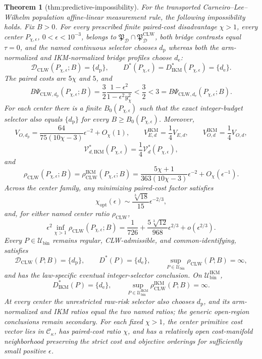 \documentclass{article}
\newtheorem{theorem}{Theorem}
\begin{document}
\begin{theorem}[thm:predictive-impossibility]\label{thm:predictive-impossibility}
For the transported Carneiro--Lee--Wilhelm population affine-linear measurement rule, the following impossibility holds. Fix \(B>0\). For every prescribed finite paired-cost disadvantage \(\chi>1\), every center \(P_{\chi,\epsilon}\), \(0<\epsilon<10^{-3}\), belongs to \(\mathfrak P_{\mathcal D}\cap\mathfrak P_{\mathcal D}^{\mathrm{CLW}}\), both bridge contrasts equal \(\tau=0\), and the named continuous selector chooses \(d_{\mathrm p}\) whereas both the arm-normalized and IKM-normalized bridge profiles choose \(d_{\mathrm e}\):
\[
 \mathcal D_{\mathrm{CLW}}(P_{\chi,\epsilon};B)=\{d_{\mathrm p}\},
 \qquad
 D^*(P_{\chi,\epsilon})=D_{\mathrm{IKM}}^*(P_{\chi,\epsilon})
 =\{d_{\mathrm e}\}.                                      \tag{1}
\]
The paired costs are \(5\chi\) and \(5\), and
\[
 B\Psi_{\mathrm{CLW},d_{\mathrm p}}(P_{\chi,\epsilon};B)
 =\frac32\frac{1-\epsilon^2}{1-\epsilon^2y_\chi^2}
 <\frac32<3
 =B\Psi_{\mathrm{CLW},d_{\mathrm e}}(P_{\chi,\epsilon};B). \tag{2}
\]
For each center there is a finite \(B_0(P_{\chi,\epsilon})\) such that the exact integer-budget selector also equals \(\{d_{\mathrm p}\}\) for every \(B\ge B_0(P_{\chi,\epsilon})\). Moreover,
\[
 V_{O,d_{\mathrm p}}
 =\frac{64}{75(10\chi-3)}\epsilon^{-2}+O_\chi(1),
 \qquad
 V_{E,d}^{\mathrm{IKM}}=\frac14V_{E,d},
 \qquad
 V_{O,d}^{\mathrm{IKM}}=\frac14V_{O,d},                    \tag{3}
\]
\[
 \mathcal V_{d,\mathrm{IKM}}^*(P_{\chi,\epsilon})
 =\frac14\mathcal V_d^*(P_{\chi,\epsilon}),               \tag{4}
\]
and
\[
 \rho_{\mathrm{CLW}}(P_{\chi,\epsilon};B)
 =\rho_{\mathrm{CLW}}^{\mathrm{IKM}}(P_{\chi,\epsilon};B)
 =\frac{5\chi+1}{363(10\chi-3)}\epsilon^{-2}
 +O_\chi(\epsilon^{-1}).                                  \tag{5}
\]
Across the center family, any minimizing paired-cost factor satisfies
\[
 \chi_{\mathrm{opt}}(\epsilon)
 \sim \frac{\sqrt[3]{18}}{15}\epsilon^{-2/3},             \tag{6}
\]
and, for either named center ratio \(\rho_{\mathrm{CLW}}\),
\[
 \epsilon^2\inf_{\chi>1}\rho_{\mathrm{CLW}}(P_{\chi,\epsilon};B)
 =\frac1{726}+\frac{5\sqrt[3]{12}}{968}\epsilon^{2/3}
 +o(\epsilon^{2/3}).                                       \tag{7}
\]
Every \(P\in\mathcal U_{\mathrm{bin}}\) remains regular, CLW-admissible, and common-identifying, satisfies
\[
 \mathcal D_{\mathrm{CLW}}(P;B)=\{d_{\mathrm p}\},
 \qquad D^*(P)=\{d_{\mathrm e}\},
 \qquad
 \sup_{P\in\mathcal U_{\mathrm{bin}}}\rho_{\mathrm{CLW}}(P;B)=\infty, \tag{8}
\]
and has the law-specific eventual integer-selector conclusion. On \(\mathcal U_{\mathrm{bin}}^{\mathrm{IKM}}\),
\[
 D_{\mathrm{IKM}}^*(P)=\{d_{\mathrm e}\},
 \qquad
 \sup_{P\in\mathcal U_{\mathrm{bin}}^{\mathrm{IKM}}}
 \rho_{\mathrm{CLW}}^{\mathrm{IKM}}(P;B)=\infty.          \tag{9}
\]
At every center the unrestricted raw-risk selector also chooses \(d_{\mathrm p}\), and its arm-normalized and IKM ratios equal the two named ratios; the generic open-region conclusions remain secondary. For each fixed \(\chi>1\), the center primitive cost vector lies in \(\mathcal C_\kappa\), has paired-cost ratio \(\chi\), and has a relatively open cost-manifold neighborhood preserving the strict cost and objective orderings for sufficiently small positive \(\epsilon\).


\end{theorem}
\end{document}
